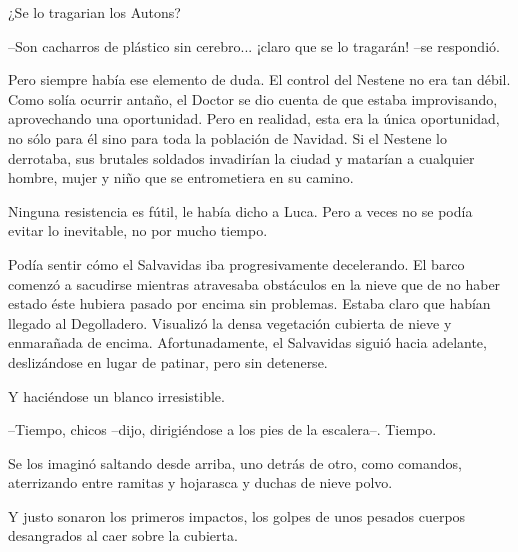 ¿Se lo tragarian los Autons?
 
--Son cacharros de plástico sin cerebro... ¡claro que se lo tragarán! --se respondió.
 
Pero siempre había ese elemento de duda. El control del Nestene no era tan débil. Como solía ocurrir antaño, el Doctor se dio cuenta de que estaba improvisando, aprovechando una oportunidad. Pero en realidad, esta era la única oportunidad, no sólo para él sino para toda la población de Navidad. Si el Nestene lo derrotaba, sus brutales soldados invadirían la ciudad y matarían a cualquier hombre, mujer y niño que se entrometiera en su camino.
 
Ninguna resistencia es fútil, le había dicho a Luca. Pero a veces no se podía evitar lo inevitable, no por mucho tiempo.
 
Podía sentir cómo el Salvavidas iba progresivamente decelerando. El barco comenzó a sacudirse mientras atravesaba obstáculos en la nieve que de no haber estado éste hubiera pasado por encima sin problemas. Estaba claro que habían llegado al Degolladero. Visualizó la densa vegetación cubierta de nieve y enmarañada de encima. Afortunadamente, el Salvavidas siguió hacia adelante, deslizándose en lugar de patinar, pero sin detenerse.
 
Y haciéndose un blanco irresistible.
 
--Tiempo, chicos --dijo, dirigiéndose a los pies de la escalera--. Tiempo.
 
Se los imaginó saltando desde arriba, uno detrás de otro, como comandos, aterrizando entre ramitas y hojarasca y duchas de nieve polvo.
 
Y justo sonaron los primeros impactos, los golpes de unos pesados cuerpos desangrados al caer sobre la cubierta.
